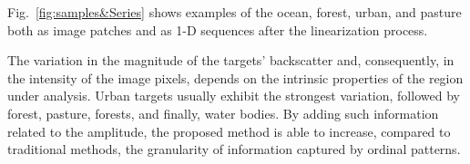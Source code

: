 \documentclass[journal]{IEEEtran}
\begin{document}
Fig.~\ref{fig:samples&Series} shows examples of the ocean, forest, urban, and pasture both as image patches and as 1-D sequences after the linearization process.

The variation in the magnitude of the targets' backscatter and, consequently, in the intensity of the image pixels, depends on the intrinsic properties of the region under analysis.
Urban targets usually exhibit the strongest variation, followed by forest, pasture, forests, and finally, water bodies.
By adding such information related to the amplitude, the proposed method is able to increase, compared to traditional methods, the granularity of information captured by ordinal patterns.

\begin{figure}[hbt]
	\centering
	

\end{figure}
\end{document}
